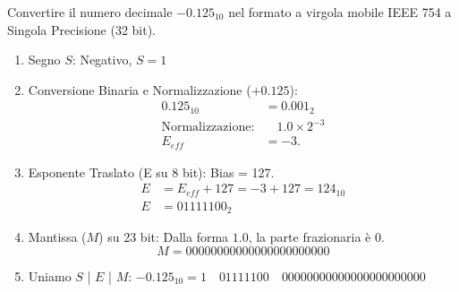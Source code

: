 \begin{Exercise}[label={ex:virgola_mobile}]
    Convertire il numero decimale $-0.125_{10}$ nel formato a virgola mobile IEEE 754 a Singola Precisione (32 bit).
\end{Exercise}

\begin{Answer}[ref={ex:virgola_mobile}]
    \begin{enumerate}
        \item Segno $S$: Negativo, $S=1$
        \item Conversione Binaria e Normalizzazione ($+0.125$):
        \begin{align*}
            0.125_{10} &= 0.001_2 \\
            \text{Normalizzazione:} & \quad 1.0 \times 2^{-3} \\
            E_{eff} &= -3.
        \end{align*}
        \item Esponente Traslato (E su 8 bit): Bias = 127.
        \begin{align*}
            E &= E_{eff} + 127 = -3 + 127 = 124_{10} \\
            E &= 01111100_2
        \end{align*}
        \item Mantissa ($M$) su 23 bit: Dalla forma $1.0$, la parte frazionaria è $0$.
        \[ M = 00000000000000000000000 \]
        \item Uniamo $S$ | $E$ | $M$:
        $-0.125_{10} = 1 \quad 01111100 \quad 00000000000000000000000$
    \end{enumerate}
\end{Answer}
